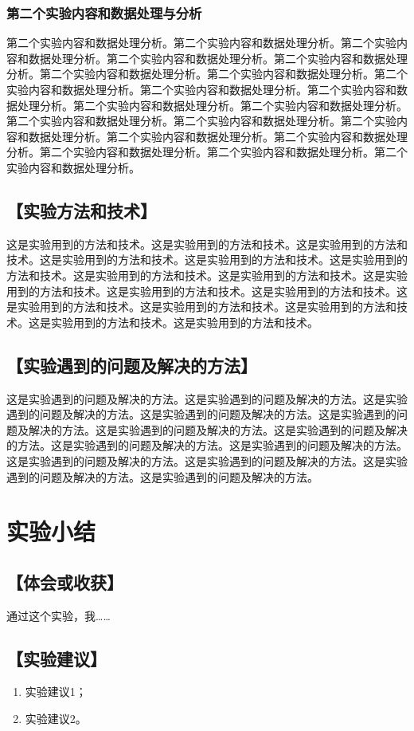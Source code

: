 \documentclass[a4paper,c5size,twoside,UTF8]{ctexart} %
\begin{document}
\subsubsection{第二个实验内容和数据处理与分析}
第二个实验内容和数据处理分析。第二个实验内容和数据处理分析。第二个实验内容和数据处理分析。第二个实验内容和数据处理分析。第二个实验内容和数据处理分析。第二个实验内容和数据处理分析。第二个实验内容和数据处理分析。第二个实验内容和数据处理分析。第二个实验内容和数据处理分析。第二个实验内容和数据处理分析。第二个实验内容和数据处理分析。第二个实验内容和数据处理分析。第二个实验内容和数据处理分析。第二个实验内容和数据处理分析。第二个实验内容和数据处理分析。第二个实验内容和数据处理分析。第二个实验内容和数据处理分析。第二个实验内容和数据处理分析。第二个实验内容和数据处理分析。第二个实验内容和数据处理分析。


\subsection{【实验方法和技术】}
这是实验用到的方法和技术。这是实验用到的方法和技术。这是实验用到的方法和技术。这是实验用到的方法和技术。这是实验用到的方法和技术。这是实验用到的方法和技术。这是实验用到的方法和技术。这是实验用到的方法和技术。这是实验用到的方法和技术。这是实验用到的方法和技术。这是实验用到的方法和技术。这是实验用到的方法和技术。这是实验用到的方法和技术。这是实验用到的方法和技术。这是实验用到的方法和技术。这是实验用到的方法和技术。

\subsection{【实验遇到的问题及解决的方法】}
这是实验遇到的问题及解决的方法。这是实验遇到的问题及解决的方法。这是实验遇到的问题及解决的方法。这是实验遇到的问题及解决的方法。这是实验遇到的问题及解决的方法。这是实验遇到的问题及解决的方法。这是实验遇到的问题及解决的方法。这是实验遇到的问题及解决的方法。这是实验遇到的问题及解决的方法。这是实验遇到的问题及解决的方法。这是实验遇到的问题及解决的方法。这是实验遇到的问题及解决的方法。这是实验遇到的问题及解决的方法。


\section{实验小结}
\subsection{【体会或收获】}
通过这个实验，我……

\subsection{【实验建议】}
\begin{enumerate}[itemsep=0pt,parsep=0pt]
	\item  实验建议1；
	\item  实验建议2。		
\end{enumerate}
\end{document}
